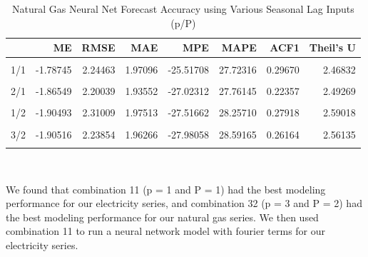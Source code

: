 \documentclass[
]{article}
\begin{document}
\begin{table}[H]

\caption{\label{tab:unnamed-chunk-7}Natural Gas Neural Net Forecast Accuracy using Various Seasonal Lag Inputs (p/P)}
\centering
\begin{tabular}[t]{l|r|r|r|r|r|r|r}
\hline
  & ME & RMSE & MAE & MPE & MAPE & ACF1 & Theil's U\\
\hline
\cellcolor{gray!6}{1/0} & \cellcolor{gray!6}{-2.29022} & \cellcolor{gray!6}{3.00280} & \cellcolor{gray!6}{2.39520} & \cellcolor{gray!6}{-33.52580} & \cellcolor{gray!6}{34.93346} & \cellcolor{gray!6}{0.62860} & \cellcolor{gray!6}{18.47359}\\
\hline
1/1 & -1.78745 & 2.24463 & 1.97096 & -25.51708 & 27.72316 & 0.29670 & 2.46832\\
\hline
\cellcolor{gray!6}{2/0} & \cellcolor{gray!6}{-2.50531} & \cellcolor{gray!6}{3.28770} & \cellcolor{gray!6}{2.68980} & \cellcolor{gray!6}{-40.09569} & \cellcolor{gray!6}{42.43958} & \cellcolor{gray!6}{0.67398} & \cellcolor{gray!6}{12.26527}\\
\hline
2/1 & -1.86549 & 2.20039 & 1.93552 & -27.02312 & 27.76145 & 0.22357 & 2.49269\\
\hline
\cellcolor{gray!6}{2/2} & \cellcolor{gray!6}{-2.02121} & \cellcolor{gray!6}{2.35638} & \cellcolor{gray!6}{2.06264} & \cellcolor{gray!6}{-30.01317} & \cellcolor{gray!6}{30.45799} & \cellcolor{gray!6}{0.27527} & \cellcolor{gray!6}{2.72891}\\
\hline
1/2 & -1.90493 & 2.31009 & 1.97513 & -27.51662 & 28.25710 & 0.27918 & 2.59018\\
\hline
\cellcolor{gray!6}{3/1} & \cellcolor{gray!6}{-1.94234} & \cellcolor{gray!6}{2.27873} & \cellcolor{gray!6}{1.99919} & \cellcolor{gray!6}{-28.62680} & \cellcolor{gray!6}{29.23123} & \cellcolor{gray!6}{0.27015} & \cellcolor{gray!6}{2.61629}\\
\hline
3/2 & -1.90516 & 2.23854 & 1.96266 & -27.98058 & 28.59165 & 0.26164 & 2.56135\\
\hline
\cellcolor{gray!6}{33} & \cellcolor{gray!6}{-2.02602} & \cellcolor{gray!6}{2.34778} & \cellcolor{gray!6}{2.11605} & \cellcolor{gray!6}{-30.45846} & \cellcolor{gray!6}{31.39579} & \cellcolor{gray!6}{0.19397} & \cellcolor{gray!6}{2.48299}\\
\hline
\end{tabular}
\end{table}

~ ~

We found that combination 11 (p = 1 and P = 1) had the best modeling
performance for our electricity series, and combination 32 (p = 3 and P
= 2) had the best modeling performance for our natural gas series. We
then used combination 11 to run a neural network model with fourier
terms for our electricity series.
\end{document}
